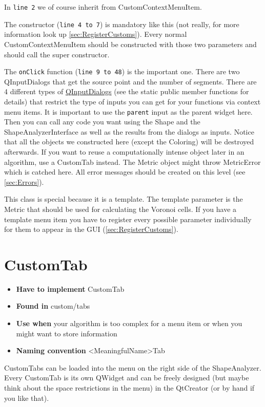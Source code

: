 In \texttt{line 2} we of course inherit from CustomContextMenuItem. 

The constructor (\texttt{line 4 to 7}) is mandatory like this (not really, for more information look up \ref{sec:RegisterCustoms}). Every normal CustomContextMenuItem should be constructed with those two parameters and should call the super constructor. 

The \texttt{onClick} function (\texttt{line 9 to 48}) is the important one. There are two QInputDialogs that get the source point and the number of segments. There are 4 different types of \href{http://qt-project.org/doc/qt-4.8/qinputdialog.html}{QInputDialogs} (see the static public member functions for details) that restrict the type of inputs you can get for your functions via context menu items. It is important to use the \texttt{parent} input as the parent widget here. 
Then you can call any code you want using the Shape and the ShapeAnalyzerInterface as well as the results from the dialogs as inputs. Notice that all the objects we constructed here (except the Coloring) will be destroyed afterwards. If you want to reuse a computationally intense object later in an algorithm, use a CustomTab instead.
The Metric object might throw MetricError which is catched here. All error messages should be created on this level (see \ref{sec:Errors}).

This class is special because it is a template. The template parameter is the Metric that should be used for calculating the Voronoi cells. If you have a template menu item you have to register every possible parameter individually for them to appear in the GUI (\ref{sec:RegisterCustoms}). 

\section{CustomTab}
\label{sec:CustomTab}

\begin{itemize}
	\item \textbf{Have to implement} CustomTab
	\item \textbf{Found in} custom/tabs
	\item \textbf{Use when} your algorithm is too complex for a menu item or when you might want to store information
	\item \textbf{Naming convention} <MeaningfulName>Tab
\end{itemize}

CustomTabs can be loaded into the menu on the right side of the ShapeAnalyzer. Every CustomTab is its own QWidget and can be freely designed (but maybe think about the space restrictions in the menu) in the QtCreator (or by hand if you like that). 

